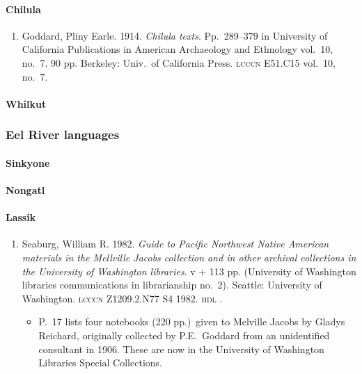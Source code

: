 \documentclass[12pt,letterpaper,oneside,article]{memoir}
\begin{document}
\paragraph{Chilula}\label{sec:chilula}

\begin{enumerate}
\item	Goddard, Pliny Earle.
	1914.
	\textit{Chilula texts}.
	Pp.\ 289–379 in University of California Publications in American Archaeology
		and Ethnology vol.\ 10, no.\ 7.
	90 pp.
	Berkeley: Univ.\ of California Press.
	\textsc{lcccn} E51.C15 vol.\ 10, no.\ 7.
\end{enumerate}

\paragraph{Whilkut}\label{sec:whilkut}

\subsubsection{Eel River languages}\label{sec:pacific-california-eelriver}

\paragraph{Sinkyone}\label{sec:sinkyone}

\paragraph{Nongatl}\label{sec:nongatl}

\paragraph{Lassik}\label{sec:lassik}

\begin{enumerate}
\item	Seaburg, William R.
	1982.
	\textit{Guide to Pacific Northwest Native American materials in the Mellville Jacobs
		collection and in other archival collections in the University of Washington
		libraries}.
	v + 113 pp.
	(University of Washington libraries communications in librarianship no.\ 2).
	Seattle: University of Washington.
	\textsc{lcccn} Z1209.2.N77 S4 1982.
	\textsc{hdl} .
	\begin{itemize}
	\item	P.\ 17 lists four notebooks (220 pp.)\ given to Melville Jacobs by Gladys
		Reichard, originally collected by P.E.\ Goddard from an unidentified
		consultant in 1906.
		These are now in the University of Washington Libraries Special Collections.
	\end{itemize}
\end{enumerate}
\end{document}
